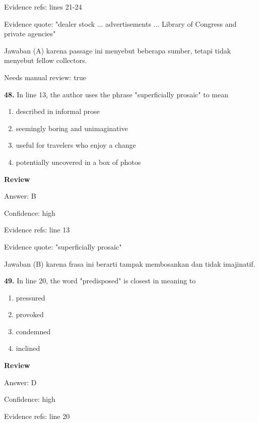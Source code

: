 \documentclass[12pt]{article}
\begin{document}
Evidence refs: lines 21-24\par
Evidence quote: "dealer stock ... advertisements ... Library of Congress and private agencies"\par
Jawaban (A) karena passage ini menyebut beberapa sumber, tetapi tidak menyebut fellow collectors.\par
Needs manual review: true\par
\endgroup
\par
\vspace{0.25\baselineskip}
\noindent\textbf{48.} In line 13, the author uses the phrase "superficially prosaic" to mean
\begin{enumerate}[label=(\Alph*),leftmargin=*,itemsep=0.2em]
\item described in informal prose
\item seemingly boring and unimaginative
\item useful for travelers who enjoy a change
\item potentially uncovered in a box of photos
\end{enumerate}
\par
\begingroup
\setlength{\parskip}{0pt}
\setlength{\parindent}{0pt}
\textbf{Review}\par
Answer: B\par
Confidence: high\par
Evidence refs: line 13\par
Evidence quote: "superficially prosaic"\par
Jawaban (B) karena frasa ini berarti tampak membosankan dan tidak imajinatif.\par
\endgroup
\par
\vspace{0.25\baselineskip}
\noindent\textbf{49.} In line 20, the word "predisposed" is closest in meaning to
\begin{enumerate}[label=(\Alph*),leftmargin=*,itemsep=0.2em]
\item pressured
\item provoked
\item condemned
\item inclined
\end{enumerate}
\par
\begingroup
\setlength{\parskip}{0pt}
\setlength{\parindent}{0pt}
\textbf{Review}\par
Answer: D\par
Confidence: high\par
Evidence refs: line 20\par
\end{document}
